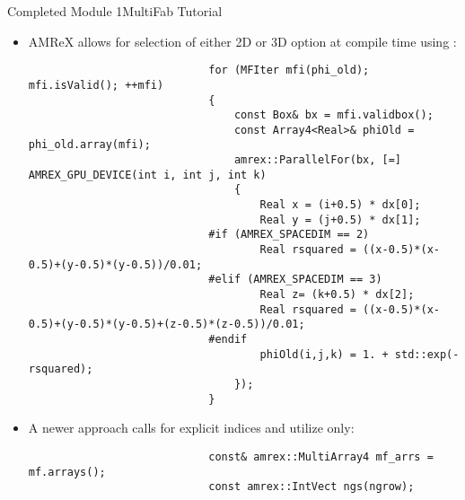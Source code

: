 \documentclass[\string~/GitHub/sthlmNordBeamerTheme/sthlmNordLightDemo.tex]{subfiles}
\begin{document}
\begin{frame}{Completed Module 1}{MultiFab Tutorial}
\begin{itemize}
\begin{center}
\begin{verbatim}
                            amrex::Real x = (i+0.5) * dx[0];
                            amrex::Real y = (j+0.5) * dx[1];
                            amrex::Real z = (k+0.5) * dx[2];
                            amrex::Real rsquared = ((x-0.5)*(x-0.5) + (y-0.5)*(y-0.5) + (z-0.5)*(z-0.5))/0.01;
                            mf_array(i,j,k) = 1.0 + std::exp(-rsquared);

                            });
                        }
                    \end{verbatim}
                \end{center}
                
		\item  AMReX allows for selection of either 2D or 3D option at compile time using :
                \begin{center}
                    \begin{verbatim}
                            for (MFIter mfi(phi_old); mfi.isValid(); ++mfi)
                            {
                                const Box& bx = mfi.validbox();
                                const Array4<Real>& phiOld = phi_old.array(mfi);
                                amrex::ParallelFor(bx, [=] AMREX_GPU_DEVICE(int i, int j, int k)
                                {
                                    Real x = (i+0.5) * dx[0];
                                    Real y = (j+0.5) * dx[1];
                            #if (AMREX_SPACEDIM == 2)
                                    Real rsquared = ((x-0.5)*(x-0.5)+(y-0.5)*(y-0.5))/0.01;
                            #elif (AMREX_SPACEDIM == 3)
                                    Real z= (k+0.5) * dx[2];
                                    Real rsquared = ((x-0.5)*(x-0.5)+(y-0.5)*(y-0.5)+(z-0.5)*(z-0.5))/0.01;
                            #endif
                                    phiOld(i,j,k) = 1. + std::exp(-rsquared);
                                });
                            }
                    \end{verbatim}
                \end{center}
                
		\item A newer approach calls for explicit indices and utilize  only:
                \begin{center}
                    \begin{verbatim}
                            const& amrex::MultiArray4 mf_arrs = mf.arrays();
                            const amrex::IntVect ngs(ngrow);


\end{verbatim}
\end{center}
\end{itemize}
\end{frame}
\end{document}
